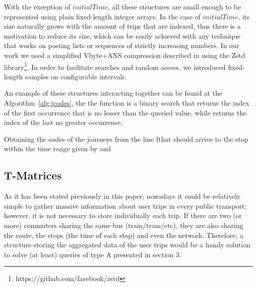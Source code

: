\documentclass[runningheads]{llncs}
\newcommand{\acumm}{T-Matrices} %
\begin{document}
With the exception of $initialTime$, all these structures are small enough to be represented using plain fixed-length integer arrays. In the case of $initialTime$, its size naturally grows with the amount of trips that are indexed, thus there is a motivation to reduce its size, which can be easily achieved with any technique that works on posting lists or sequences of strictly increasing numbers. In our work we used a simplified Vbyte+ANS compression described in \cite{moffat2017ans} using the Zstd library\footnote{https://github.com/facebook/zstd}. In order to facilitate searches and random access, we introduced fixed-length samples on configurable intervals.

An example of these structures interacting together can be found at the Algorithm~\ref{alg:jcodes}, the the function  is a binary search that returns the index of the first occurrence that is no lesser than the queried value, while  returns the index of the last no greater occurrence.

\begin{algorithm}[H]
 
 
 \caption{Obtaining the codes of the journeys from the line \l that should arrive to the stop \s within the time range given by \ta and \tz}
 \label{alg:jcodes}
\end{algorithm}

\subsection{\acumm}
\label{sec:acumm}
As it has been stated previously in this paper, nowadays it could be relatively simple to gather massive information about user trips in every public transport; however, it is not necessary to store individually each trip. If there are two (or more) commuters sharing the same bus (train/tram/etc), they are also sharing the route, the stops (the time of each stop) and even the network. Therefore, a structure storing the aggregated data of the user trips would be a handy solution to solve (at least) queries of type A presented in section 3.
\end{document}
